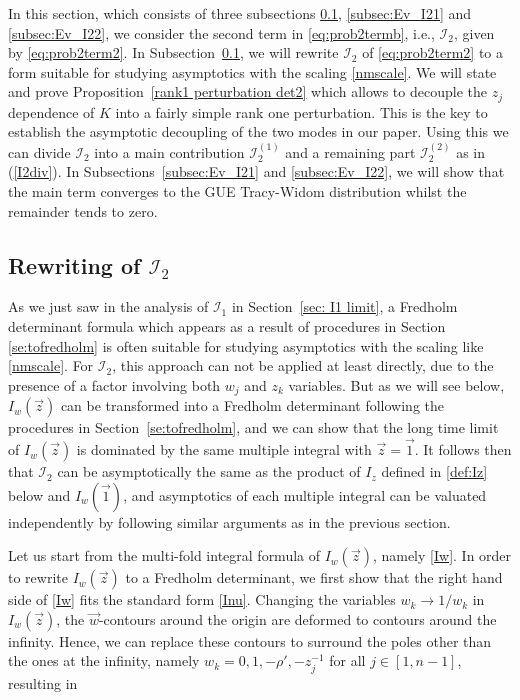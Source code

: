 \documentclass[cmp]{svjour}
\numberwithin{theorem}{section}
\numberwithin{equation}{section}
\begin{document}
In this section, which consists of three subsections \ref{subsec:Deform_I2}, \ref{subsec:Ev_I21} and \ref{subsec:Ev_I22}, we consider the second term in \eqref{eq:prob2termb}, i.e., $\mathcal{I}_2$, given by \eqref{eq:prob2term2}.
In Subsection~\ref{subsec:Deform_I2}, we will rewrite $\mathcal{I}_2$ of \eqref{eq:prob2term2} to a form suitable for studying asymptotics  with the scaling \eqref{nmscale}.
We will state and prove Proposition~\ref{rank1 perturbation det2} which allows to decouple the $z_j$ dependence of $K$ into a fairly simple rank one perturbation. This is the key to establish the asymptotic decoupling of the two modes in our paper. Using this we can divide $\mathcal{I}_2$ into a main contribution $\mathcal{I}_2^{(1)}$ and a remaining part
$\mathcal{I}_2^{(2)}$ as in (\ref{I2div}).
In Subsections~\ref{subsec:Ev_I21} and \ref{subsec:Ev_I22}, we will show that the main term converges to the GUE Tracy-Widom distribution whilst the remainder tends to zero.

\subsection{Rewriting of $\mathcal{I}_2$} 
\label{subsec:Deform_I2}

As we just saw in the analysis of $\mathcal{I}_1$ in Section~\ref{sec: I1 limit}, a Fredholm determinant formula which appears as a result of procedures in
Section \ref{se:tofredholm} is often suitable for studying asymptotics with the scaling like \eqref{nmscale}.
For $\mathcal{I}_2$, this approach can not be applied at least directly,
due to the presence of a factor involving both $w_j$ and $z_k$ variables. 
But as we will see below, $I_w(\vec{z})$ can be transformed into a Fredholm determinant following the procedures in Section~\ref{se:tofredholm}, 
and we can show that the long time limit of $I_w(\vec{z})$ is dominated by the 
same multiple integral with $\vec{z}=\vec{1}$.
It follows then that $\mathcal{I}_2$ can be asymptotically the same as the product of 
$I_z$ defined in \eqref{def:Iz} below and $I_w(\vec{1})$, and asymptotics
of each multiple integral can be valuated independently by following similar 
arguments as in the previous section. 

Let us start from the multi-fold integral formula of $I_w(\vec{z})$, namely \eqref{Iw}.
In order to rewrite $I_w(\vec{z})$ to a Fredholm determinant, we first show that the right hand side of \eqref{Iw} fits the standard form \eqref{Inu}.
Changing the variables $w_k\rightarrow1/w_k$ in $I_w(\vec{z})$, the $\vec{w}$-contours around the origin are deformed to contours around the infinity.
Hence, we can replace these contours to surround the poles other than the ones at the infinity, namely  $w_k=0,1,-\rho',-z_j^{-1}$ for all $j\in[1,n-1]$, resulting in
\end{document}
